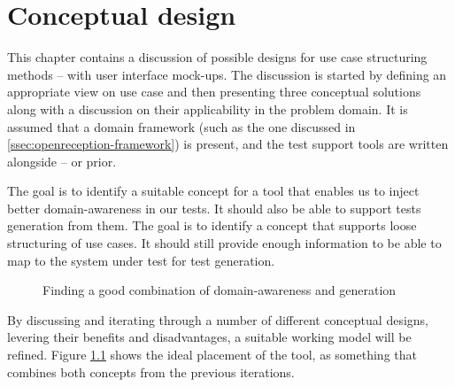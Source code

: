 \chapter{Conceptual design}
\label{chap:conceptual_design}
This chapter contains a discussion of possible designs for use case structuring methods -- with user interface mock-ups. The discussion is started by defining an appropriate view on use case and then presenting three conceptual solutions along with a discussion on their applicability in the problem domain. It is assumed that a domain framework (such as the one discussed in \ref{ssec:openreception-framework}) is present, and the test support tools are written alongside -- or prior.\medskip

\noindent The goal is to identify a suitable concept for a tool that enables us to inject better domain-awareness in our tests. It should also be able to support tests generation from them. The goal is to identify a concept that supports loose structuring of use cases. It should still provide enough information to be able to map to the system under test for test generation.\medskip
\begin{figure}[!htbp]
\centering

\caption{Finding a good combination of domain-awareness and generation}
\label{fig:project_parameter_plot_project}
\end{figure}

\noindent By discussing and iterating through a number of different conceptual designs, levering their benefits and disadvantages, a suitable  working model will be refined. Figure \ref{fig:project_parameter_plot_project} shows the ideal placement of the tool, as something that combines both concepts from the previous iterations.

